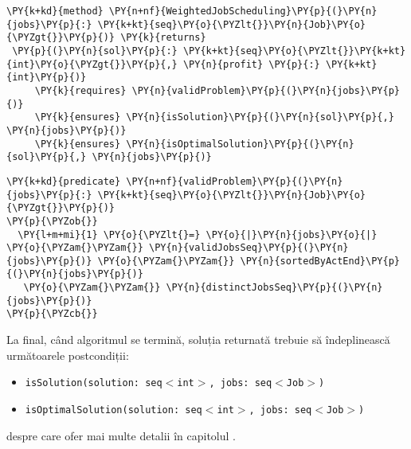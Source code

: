 \begin{Verbatim}[commandchars=\\\{\}, fontsize=\footnotesize]
\PY{k+kd}{method} \PY{n+nf}{WeightedJobScheduling}\PY{p}{(}\PY{n}{jobs}\PY{p}{:} \PY{k+kt}{seq}\PY{o}{\PYZlt{}}\PY{n}{Job}\PY{o}{\PYZgt{}}\PY{p}{)} \PY{k}{returns}
 \PY{p}{(}\PY{n}{sol}\PY{p}{:} \PY{k+kt}{seq}\PY{o}{\PYZlt{}}\PY{k+kt}{int}\PY{o}{\PYZgt{}}\PY{p}{,} \PY{n}{profit} \PY{p}{:} \PY{k+kt}{int}\PY{p}{)}
     \PY{k}{requires} \PY{n}{validProblem}\PY{p}{(}\PY{n}{jobs}\PY{p}{)}
     \PY{k}{ensures} \PY{n}{isSolution}\PY{p}{(}\PY{n}{sol}\PY{p}{,} \PY{n}{jobs}\PY{p}{)}
     \PY{k}{ensures} \PY{n}{isOptimalSolution}\PY{p}{(}\PY{n}{sol}\PY{p}{,} \PY{n}{jobs}\PY{p}{)}
\end{Verbatim}

\begin{Verbatim}[commandchars=\\\{\}, fontsize=\footnotesize]
 \PY{k+kd}{predicate} \PY{n+nf}{validProblem}\PY{p}{(}\PY{n}{jobs}\PY{p}{:} \PY{k+kt}{seq}\PY{o}{\PYZlt{}}\PY{n}{Job}\PY{o}{\PYZgt{}}\PY{p}{)}
\PY{p}{\PYZob{}}
  \PY{l+m+mi}{1} \PY{o}{\PYZlt{}=} \PY{o}{|}\PY{n}{jobs}\PY{o}{|} \PY{o}{\PYZam{}\PYZam{}} \PY{n}{validJobsSeq}\PY{p}{(}\PY{n}{jobs}\PY{p}{)} \PY{o}{\PYZam{}\PYZam{}} \PY{n}{sortedByActEnd}\PY{p}{(}\PY{n}{jobs}\PY{p}{)}
   \PY{o}{\PYZam{}\PYZam{}} \PY{n}{distinctJobsSeq}\PY{p}{(}\PY{n}{jobs}\PY{p}{)}
\PY{p}{\PYZcb{}}
\end{Verbatim}

La final, când algoritmul se termină, soluția returnată trebuie să îndeplinească următoarele postcondiții:
\begin{itemize}
    \item \texttt{isSolution(solution: seq$<$int$>$, jobs: seq$<$Job$>$)}
    
    \item \texttt{isOptimalSolution(solution: seq$<$int$>$, jobs: seq$<$Job$>$)}
\end{itemize}despre care ofer mai multe detalii în capitolul .\\


